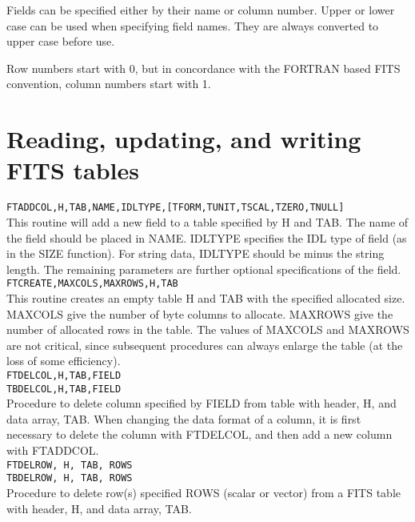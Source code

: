 Fields can be specified either by their name or column number.   
Upper or lower case can be used when specifying field names.
They are always converted to upper case before use.

Row numbers start with 0, but in concordance with the FORTRAN based
FITS convention, column numbers start with 1.
                          
\section{Reading, updating, and writing FITS tables}

{\tt FTADDCOL,H,TAB,NAME,IDLTYPE,[TFORM,TUNIT,TSCAL,TZERO,TNULL]} \\

	This routine will add a new field to a table specified by
        H and TAB.  The name of the field should be placed in NAME.
        IDLTYPE specifies the IDL type of field (as in the SIZE
        function).  For string data, IDLTYPE should be minus the
        string length.  The remaining parameters are further optional
        specifications of the field.  \\
 
{\tt FTCREATE,MAXCOLS,MAXROWS,H,TAB} \\

	This routine creates an empty table H and TAB with the 
	specified allocated size.  MAXCOLS give the number of
        byte columns to allocate.  MAXROWS give the number of 
        allocated rows in the table.  The values of MAXCOLS and
        MAXROWS are not critical, since subsequent procedures
        can always enlarge the table (at the loss of some 
        efficiency). \\

{\tt FTDELCOL,H,TAB,FIELD} \\
{\tt TBDELCOL,H,TAB,FIELD} \\

        Procedure to delete column specified by FIELD from table
        with header, H, and data array, TAB.   When changing the
        data format of a column, it is first necessary to delete
        the column with FTDELCOL, and then add a new column with
        FTADDCOL.  \\

{\tt FTDELROW, H, TAB, ROWS}  \\
{\tt TBDELROW, H, TAB, ROWS} \\

        Procedure to delete row(s) specified ROWS (scalar or vector)
        from a FITS table with header, H, and data array, TAB. \\


